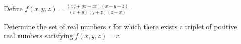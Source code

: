 Define $f(x,y,z)=\frac{(xy+yz+zx)(x+y+z)}{(x+y)(y+z)(z+x)}$.

Determine the set of real numbers $r$ for which there exists a triplet of positive real numbers satisfying $f(x,y,z)=r$.